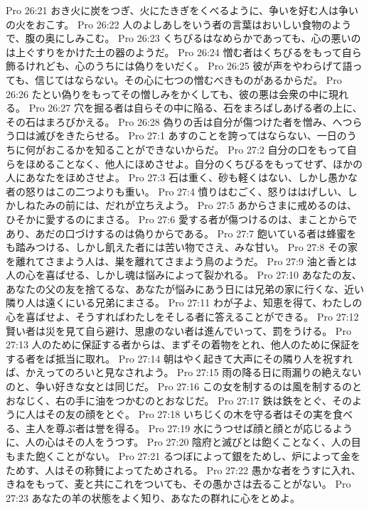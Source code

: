Pro 26:21  おき火に炭をつぎ、火にたきぎをくべるように、争いを好む人は争いの火をおこす。
Pro 26:22  人のよしあしをいう者の言葉はおいしい食物のようで、腹の奥にしみこむ。
Pro 26:23  くちびるはなめらかであっても、心の悪いのは上ぐすりをかけた土の器のようだ。
Pro 26:24  憎む者はくちびるをもって自ら飾るけれども、心のうちには偽りをいだく。
Pro 26:25  彼が声をやわらげて語っても、信じてはならない。その心に七つの憎むべきものがあるからだ。
Pro 26:26  たとい偽りをもってその憎しみをかくしても、彼の悪は会衆の中に現れる。
Pro 26:27  穴を掘る者は自らその中に陥る、石をまろばしあげる者の上に、その石はまろびかえる。
Pro 26:28  偽りの舌は自分が傷つけた者を憎み、へつらう口は滅びをきたらせる。
Pro 27:1  あすのことを誇ってはならない、一日のうちに何がおこるかを知ることができないからだ。
Pro 27:2  自分の口をもって自らをほめることなく、他人にほめさせよ。自分のくちびるをもってせず、ほかの人にあなたをほめさせよ。
Pro 27:3  石は重く、砂も軽くはない、しかし愚かな者の怒りはこの二つよりも重い。
Pro 27:4  憤りはむごく、怒りははげしい、しかしねたみの前には、だれが立ちえよう。
Pro 27:5  あからさまに戒めるのは、ひそかに愛するのにまさる。
Pro 27:6  愛する者が傷つけるのは、まことからであり、あだの口づけするのは偽りからである。
Pro 27:7  飽いている者は蜂蜜をも踏みつける、しかし飢えた者には苦い物でさえ、みな甘い。
Pro 27:8  その家を離れてさまよう人は、巣を離れてさまよう鳥のようだ。
Pro 27:9  油と香とは人の心を喜ばせる、しかし魂は悩みによって裂かれる。
Pro 27:10  あなたの友、あなたの父の友を捨てるな、あなたが悩みにあう日には兄弟の家に行くな、近い隣り人は遠くにいる兄弟にまさる。
Pro 27:11  わが子よ、知恵を得て、わたしの心を喜ばせよ、そうすればわたしをそしる者に答えることができる。
Pro 27:12  賢い者は災を見て自ら避け、思慮のない者は進んでいって、罰をうける。
Pro 27:13  人のために保証する者からは、まずその着物をとれ、他人のために保証をする者をば抵当に取れ。
Pro 27:14  朝はやく起きて大声にその隣り人を祝すれば、かえってのろいと見なされよう。
Pro 27:15  雨の降る日に雨漏りの絶えないのと、争い好きな女とは同じだ。
Pro 27:16  この女を制するのは風を制するのとおなじく、右の手に油をつかむのとおなじだ。
Pro 27:17  鉄は鉄をとぐ、そのように人はその友の顔をとぐ。
Pro 27:18  いちじくの木を守る者はその実を食べる、主人を尊ぶ者は誉を得る。
Pro 27:19  水にうつせば顔と顔とが応じるように、人の心はその人をうつす。
Pro 27:20  陰府と滅びとは飽くことなく、人の目もまた飽くことがない。
Pro 27:21  るつぼによって銀をためし、炉によって金をためす、人はその称賛によってためされる。
Pro 27:22  愚かな者をうすに入れ、きねをもって、麦と共にこれをついても、その愚かさは去ることがない。
Pro 27:23  あなたの羊の状態をよく知り、あなたの群れに心をとめよ。
